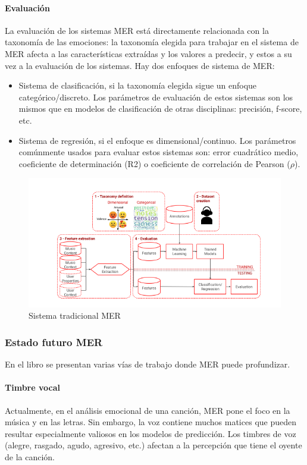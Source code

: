 \documentclass[12pt,a4paper]{article}
\begin{document}
\paragraph{Evaluación}
La evaluación de los sistemas MER está directamente relacionada con la taxonomía de las emociones: la taxonomía elegida para trabajar en el sistema de MER afecta a las características extraídas y los valores a predecir, y estos a su vez a la evaluación de los sistemas. Hay dos enfoques de sistema de MER:
\begin{itemize}
	\item Sistema de clasificación, si la taxonomía elegida sigue un enfoque categórico/discreto. Los parámetros de evaluación de estos sistemas son los mismos que en modelos de clasificación de otras disciplinas: precisión, f-score, etc.
	\item Sistema de regresión, si el enfoque es dimensional/continuo. Los parámetros comúnmente usados para evaluar estos sistemas son: error cuadrático medio, coeficiente de determinación (R2) o coeficiente de correlación de Pearson ($\rho$).
\end{itemize}
\begin{figure}[H]
	\centering
	\includegraphics[width=1\linewidth]{figs/mer_traditional_system}
	\caption{Sistema tradicional MER \cite{GomezCanon2021SPM}}
	\label{fig:mertraditionalsystem}
\end{figure}
\subsubsection{Estado futuro MER}
En el libro  \cite{yang2011music} se presentan varias vías de trabajo donde MER puede profundizar.

\paragraph{Timbre vocal}
Actualmente, en el análisis emocional de una canción, MER pone el foco en la música y en las letras. Sin embargo, la voz contiene muchos matices que pueden resultar  especialmente valiosos en los modelos de predicción. Los timbres de voz (alegre, rasgado, agudo, agresivo, etc.) afectan a la percepción que tiene el oyente de la canción.
\end{document}
